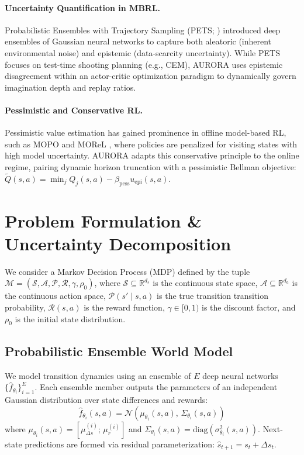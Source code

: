 \documentclass[11pt,a4paper]{article}
\theoremstyle{definition}
\theoremstyle{remark}
\begin{document}
\paragraph{Uncertainty Quantification in MBRL.}
Probabilistic Ensembles with Trajectory Sampling (PETS; \citealt{chua2018pets}) introduced deep ensembles of Gaussian neural networks to capture both aleatoric (inherent environmental noise) and epistemic (data-scarcity uncertainty). While PETS focuses on test-time shooting planning (e.g., CEM), AURORA uses epistemic disagreement within an actor-critic optimization paradigm to dynamically govern imagination depth and replay ratios.

\paragraph{Pessimistic and Conservative RL.}
Pessimistic value estimation has gained prominence in offline model-based RL, such as MOPO \citep{yu2020mopo} and MOReL \citep{kidambi2020morel}, where policies are penalized for visiting states with high model uncertainty. AURORA adapts this conservative principle to the online regime, pairing dynamic horizon truncation with a pessimistic Bellman objective: $\tilde{Q}(s, a) = \min_j Q_j(s, a) - \beta_{\text{pess}} u_{\text{epi}}(s, a)$.

\section{Problem Formulation \& Uncertainty Decomposition}
\label{sec:formulation}

We consider a Markov Decision Process (MDP) defined by the tuple $\mathcal{M} = (\mathcal{S}, \mathcal{A}, \mathcal{P}, \mathcal{R}, \gamma, \rho_0)$, where $\mathcal{S} \subseteq \mathbb{R}^{d_s}$ is the continuous state space, $\mathcal{A} \subseteq \mathbb{R}^{d_a}$ is the continuous action space, $\mathcal{P}(s' \mid s, a)$ is the true transition transition probability, $\mathcal{R}(s, a)$ is the reward function, $\gamma \in [0, 1)$ is the discount factor, and $\rho_0$ is the initial state distribution.

\subsection{Probabilistic Ensemble World Model}

We model transition dynamics using an ensemble of $E$ deep neural networks $\{\hat{f}_{\theta_i}\}_{i=1}^E$. Each ensemble member outputs the parameters of an independent Gaussian distribution over state differences and rewards:
\begin{equation}
    \hat{f}_{\theta_i}(s, a) = \mathcal{N}\left( \mu_{\theta_i}(s, a),\, \Sigma_{\theta_i}(s, a) \right)
\end{equation}
where $\mu_{\theta_i}(s, a) = \left[ \mu_{\Delta s}^{(i)};\, \mu_r^{(i)} \right]$ and $\Sigma_{\theta_i}(s, a) = \text{diag}\left( \sigma_{\theta_i}^2(s, a) \right)$. Next-state predictions are formed via residual parameterization: $\hat{s}_{t+1} = s_t + \Delta s_t$.
\end{document}
